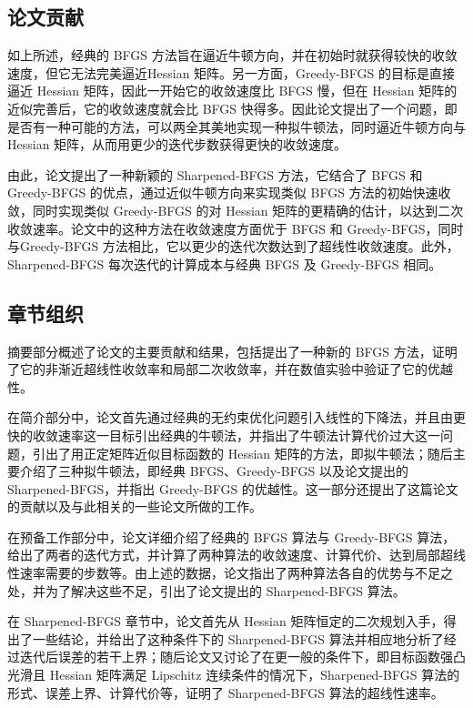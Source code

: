\documentclass[a4paper,twoside,AutoFakeBold]{article}
\theoremstyle{definition}
\begin{document}
\subsection{论文贡献}
如上所述，经典的 BFGS 方法旨在逼近牛顿方向，并在初始时就获得较快的收敛速度，但它无法完美逼近Hessian 矩阵。另一方面，Greedy-BFGS 的目标是直接逼近 Hessian 矩阵，因此一开始它的收敛速度比 BFGS 慢，但在 Hessian 矩阵的近似完善后，它的收敛速度就会比 BFGS 快得多。因此论文提出了一个问题，即是否有一种可能的方法，可以两全其美地实现一种拟牛顿法，同时逼近牛顿方向与 Hessian 矩阵，从而用更少的迭代步数获得更快的收敛速度。

由此，论文提出了一种新颖的 Sharpened-BFGS 方法，它结合了 BFGS 和 Greedy-BFGS 的优点，通过近似牛顿方向来实现类似 BFGS 方法的初始快速收敛，同时实现类似 Greedy-BFGS 的对 Hessian 矩阵的更精确的估计，以达到二次收敛速率。论文中的这种方法在收敛速度方面优于 BFGS 和 Greedy-BFGS，同时与Greedy-BFGS 方法相比，它以更少的迭代次数达到了超线性收敛速度。此外，Sharpened-BFGS 每次迭代的计算成本与经典 BFGS 及 Greedy-BFGS 相同。
\subsection{章节组织}
摘要部分概述了论文的主要贡献和结果，包括提出了一种新的 BFGS 方法，证明了它的非渐近超线性收敛率和局部二次收敛率，并在数值实验中验证了它的优越性。

在简介部分中，论文首先通过经典的无约束优化问题引入线性的下降法，并且由更快的收敛速率这一目标引出经典的牛顿法，并指出了牛顿法计算代价过大这一问题，引出了用正定矩阵近似目标函数的 Hessian 矩阵的方法，即拟牛顿法；随后主要介绍了三种拟牛顿法，即经典 BFGS、Greedy-BFGS 以及论文提出的 Sharpened-BFGS，并指出 Greedy-BFGS 的优越性。这一部分还提出了这篇论文的贡献以及与此相关的一些论文所做的工作。

在预备工作部分中，论文详细介绍了经典的 BFGS 算法与 Greedy-BFGS 算法，给出了两者的迭代方式，并计算了两种算法的收敛速度、计算代价、达到局部超线性速率需要的步数等。由上述的数据，论文指出了两种算法各自的优势与不足之处，并为了解决这些不足，引出了论文提出的 Sharpened-BFGS 算法。

在 Sharpened-BFGS 章节中，论文首先从 Hessian 矩阵恒定的二次规划入手，得出了一些结论，并给出了这种条件下的 Sharpened-BFGS 算法并相应地分析了经过迭代后误差的若干上界；随后论文又讨论了在更一般的条件下，即目标函数强凸光滑且 Hessian 矩阵满足 Lipschitz 连续条件的情况下，Sharpened-BFGS 算法的形式、误差上界、计算代价等，证明了 Sharpened-BFGS 算法的超线性速率。
\end{document}
